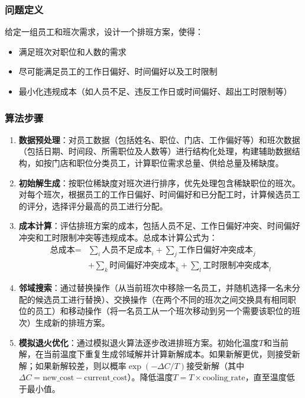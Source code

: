 \documentclass{ctexart}
\begin{document}
\subsubsection{问题定义}
给定一组员工和班次需求，设计一个排班方案，使得：
\begin{itemize}
    \item 满足班次对职位和人数的需求
    \item 尽可能满足员工的工作日偏好、时间偏好以及工时限制
    \item 最小化违规成本（如人员不足、违反工作日或时间偏好、超出工时限制等）
\end{itemize}

\subsubsection{算法步骤}
\begin{enumerate}
    \item \textbf{数据预处理}：对员工数据（包括姓名、职位、门店、工作偏好等）和班次数据（包括日期、时间段、所需职位及人数等）进行结构化处理，构建辅助数据结构，如按门店和职位分类员工，计算职位需求总量、供给总量及稀缺度。
    
    \item \textbf{初始解生成}：按职位稀缺度对班次进行排序，优先处理包含稀缺职位的班次。对每个班次，根据员工的工作日偏好、时间偏好和已分配工时，计算候选员工的评分，选择评分最高的员工进行分配。
    
    \item \textbf{成本计算}：评估排班方案的成本，包括人员不足、工作日偏好冲突、时间偏好冲突和工时限制冲突等违规成本。总成本计算公式为：
    \begin{equation}
    \begin{split}
    \text{总成本} = & \sum_{i} \text{人员不足成本}_i + \sum_{j} \text{工作日偏好冲突成本}_j \\
                   & + \sum_{k} \text{时间偏好冲突成本}_k + \sum_{l} \text{工时限制冲突成本}_l
    \end{split}
    \end{equation}
    
    \item \textbf{邻域搜索}：通过替换操作（从当前班次中移除一名员工，并随机选择一名未分配的候选员工进行替换）、交换操作（在两个不同的班次之间交换具有相同职位的员工）和移动操作（将一名员工从一个班次移动到另一个需要该职位的班次）生成新的排班方案。
    
    \item \textbf{模拟退火优化}：通过模拟退火算法逐步改进排班方案。初始化温度$T$和当前解，在当前温度下重复生成邻域解并计算新解成本。如果新解更优，则接受新解；如果新解较差，则以概率$\exp(-\Delta C / T)$接受新解（其中$\Delta C = \text{new\_cost} - \text{current\_cost}$）。降低温度$T = T \times \text{cooling\_rate}$，直至温度低于最小值。
\end{enumerate}
\end{document}
